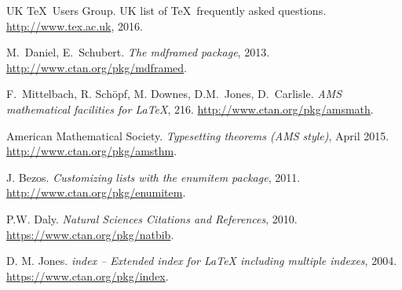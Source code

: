 \documentclass{ltxdoc}
\begin{document}
\begin{thebibliography}{9}
 UK \TeX\ Users Group. UK list of \TeX\ frequently asked questions. 
\url{http://www.tex.ac.uk}, 2016.

M.~Daniel, E.~Schubert. \textit{The mdframed package}, 
2013. \url{http://www.ctan.org/pkg/mdframed}.

F.~Mittelbach, R. Sch\"opf, M. Downes, D.M.~Jones, D.~Carlisle. \textit{AMS mathematical facilities for \LaTeX}, 216. \url{http://www.ctan.org/pkg/amsmath}. 

American Mathematical Society. \textit{Typesetting theorems (AMS style)}, April 2015. 
\url{http://www.ctan.org/pkg/amsthm}.

J. Bezos. 
\textit{Customizing lists with the enumitem package}, 2011. 
\url{http://www.ctan.org/pkg/enumitem}.

P.W. Daly.
\textit{Natural Sciences Citations and References}, 
2010. 
\url{https://www.ctan.org/pkg/natbib}.

D. M. Jones.
\textit{index – Extended index for LaTeX including multiple indexes}, 2004.
\url{https://www.ctan.org/pkg/index}.

\end{thebibliography}
\end{document}
